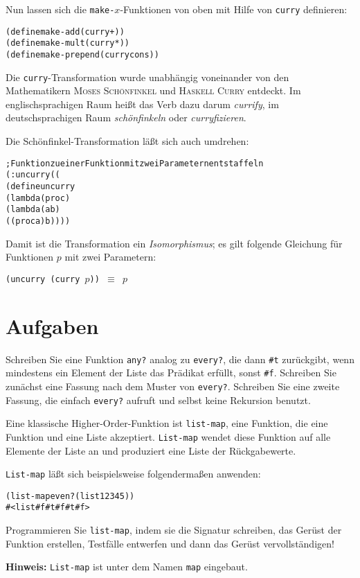 %
Nun lassen sich die \texttt{make-$x$}-Funktionen von oben mit Hilfe
von \texttt{curry} definieren:
%
\begin{alltt}
(define make-add (curry +))
(define make-mult (curry *))
(define make-prepend (curry cons))
\end{alltt}
%
Die \texttt{curry}-Transformation wurde unabhängig voneinander von den
Mathematikern \textsc{Moses Schönfinkel} und \textsc{Haskell Curry} entdeckt.  Im
englischsprachigen Raum heißt das Verb dazu darum  \textit{currify}, im deutschsprachigen Raum
\textit{schönfinkeln}
oder \textit{curryfizieren}.

Die Schönfinkel-Transformation läßt sich auch umdrehen:
%
\begin{alltt}
; Funktion zu einer Funktion mit zwei Parametern entstaffeln
(: uncurry ((%a -> (%b -> %c)) -> (%a %b -> %c)))
(define uncurry 
  (lambda (proc)
    (lambda (a b)
      ((proc a) b))))
\end{alltt}
%
Damit ist die Transformation ein \textit{Isomorphismus}; es gilt
folgende Gleichung für Funktionen $p$ mit zwei Parametern:\label{sec:curry-isomorphismus}
%
\begin{center}
  \texttt{(uncurry (curry \(p\))) \(\equiv\) \(p\)}
\end{center}

\section*{Aufgaben}

\begin{aufgabe}
  Schreiben Sie eine Funktion \texttt{any?} analog zu 
  \texttt{every?}, die dann \verb|#t| zurückgibt, wenn mindestens ein 
  Element der Liste das Prädikat erfüllt, sonst \verb|#f|.  Schreiben Sie 
  zunächst eine Fassung nach dem Muster von \texttt{every?}.  Schreiben 
  Sie eine zweite Fassung, die einfach \texttt{every?} aufruft und selbst keine
  Rekursion benutzt.
\end{aufgabe}

\begin{aufgabe}
  Eine klassische Higher-Order-Funktion ist \texttt{list-map}, eine Funktion, die 
  eine Funktion und eine Liste akzeptiert.  \texttt{List-map}
  wendet diese Funktion auf alle Elemente der Liste an und produziert
  eine Liste der Rückgabewerte.

  \texttt{List-map} läßt sich beispielsweise folgendermaßen anwenden:
  \begin{alltt}
    (list-map even? (list 1 2 3 4 5))
    \evalsto{} #<list #f #t #f #t #f>
  \end{alltt}
  Programmieren Sie \texttt{list-map}, indem sie die Signatur schreiben,
  das Gerüst der Funktion erstellen, Testfälle entwerfen und dann das
  Gerüst vervollständigen!

  \textbf{Hinweis:} \texttt{List-map} ist unter dem Namen \texttt{map} eingebaut.
\end{aufgabe}

